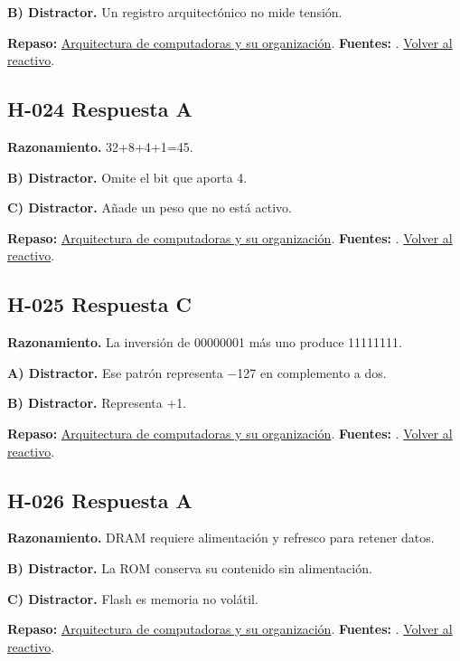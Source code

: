 \textbf{B) Distractor. }Un registro arquitectónico no mide tensión.

\textbf{Repaso:} \hyperref[sec:h2]{Arquitectura de computadoras y su organización}. \textbf{Fuentes:} \cite{intel,architecture}. \hyperref[q:H-023]{Volver al reactivo}.\par\medskip

\subsection*{H-024 \quad Respuesta A}\label{s:H-024}
\textbf{Razonamiento.} 32+8+4+1=45.

\textbf{B) Distractor. }Omite el bit que aporta 4.

\textbf{C) Distractor. }Añade un peso que no está activo.

\textbf{Repaso:} \hyperref[sec:h2]{Arquitectura de computadoras y su organización}. \textbf{Fuentes:} \cite{intel,architecture}. \hyperref[q:H-024]{Volver al reactivo}.\par\medskip

\subsection*{H-025 \quad Respuesta C}\label{s:H-025}
\textbf{Razonamiento.} La inversión de 00000001 más uno produce 11111111.

\textbf{A) Distractor. }Ese patrón representa −127 en complemento a dos.

\textbf{B) Distractor. }Representa +1.

\textbf{Repaso:} \hyperref[sec:h2]{Arquitectura de computadoras y su organización}. \textbf{Fuentes:} \cite{intel,architecture}. \hyperref[q:H-025]{Volver al reactivo}.\par\medskip

\subsection*{H-026 \quad Respuesta A}\label{s:H-026}
\textbf{Razonamiento.} DRAM requiere alimentación y refresco para retener datos.

\textbf{B) Distractor. }La ROM conserva su contenido sin alimentación.

\textbf{C) Distractor. }Flash es memoria no volátil.

\textbf{Repaso:} \hyperref[sec:h2]{Arquitectura de computadoras y su organización}. \textbf{Fuentes:} \cite{intel,architecture}. \hyperref[q:H-026]{Volver al reactivo}.\par\medskip

